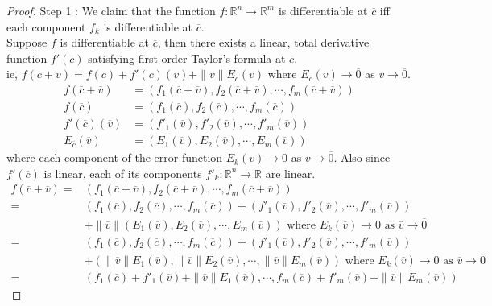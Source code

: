 \begin{proof}
	\par{Step 1 :} We claim that the function $f : \mathbb{R}^n \to \mathbb{R}^m$ is differentiable at $\overline{c}$ iff each component $f_k$ is differentiable at $\overline{c}$.\\

	Suppose $f$ is differentiable at $\overline{c}$, then there exists a linear, total derivative function $f'(\overline{c})$ satisfying first-order Taylor's formula at $\overline{c}$.\\
	ie, $f(\overline{c}+\overline{v}) = f(\overline{c}) + f'(\overline{c})(\overline{v}) + \|\overline{v}\| E_{\overline{c}}(\overline{v})$ where $E_{\overline{c}}(\overline{v}) \to \overline{0}$ as $\overline{v} \to \overline{0}$.
	\begin{align*}
		f(\overline{c}+\overline{v}) & = \left( f_1(\overline{c}+\overline{v}), f_2(\overline{c}+\overline{v}), \cdots, f_m(\overline{c}+\overline{v}) \right)\\
		f(\overline{c}) & = \left( f_1(\overline{c}), f_2(\overline{c}), \cdots, f_m(\overline{c}) \right) \\
		f'(\overline{c})(\overline{v}) & = \left( f'_1(\overline{v}), f'_2(\overline{v}), \cdots, f'_m(\overline{v}) \right) \\
		E_{\overline{c}}(\overline{v}) & = \left( E_1(\overline{v}), E_2(\overline{v}), \cdots, E_m(\overline{v}) \right)
	\end{align*}
	where each component of the error function $E_k(\overline{v}) \to 0$ as $\overline{v} \to \overline{0}$.
	Also since $f'(\overline{c})$ is linear, each of its components $f'_k : \mathbb{R}^n \to \mathbb{R}$ are linear.
	\begin{align*}
		f(\overline{c}+\overline{v}) = & \left( f_1(\overline{c}+\overline{v}), f_2(\overline{c}+\overline{v}), \cdots, f_m(\overline{c}+\overline{v}) \right) \\
		= & \left( f_1(\overline{c}), f_2(\overline{c}), \cdots, f_m(\overline{c}) \right) + \left( f'_1(\overline{v}), f'_2(\overline{v}), \cdots, f'_m(\overline{v}) \right) \\
		& + \|\overline{v}\|\left(E_1(\overline{v}), E_2(\overline{v}), \cdots, E_m(\overline{v}) \right) \text{ where } E_k(\overline{v}) \to 0 \text{ as } \overline{v} \to \overline{0}\\
		= & \left( f_1(\overline{c}), f_2(\overline{c}), \cdots, f_m(\overline{c}) \right) + \left( f'_1(\overline{v}), f'_2(\overline{v}), \cdots, f'_m(\overline{v}) \right) \\
		& + \left(\|\overline{v}\|E_1(\overline{v}), \|\overline{v}\|E_2(\overline{v}), \cdots, \|\overline{v}\|E_m(\overline{v}) \right) \text{ where } E_k(\overline{v}) \to 0 \text{ as } \overline{v} \to \overline{0}\\
		= & \left( f_1(\overline{c}) + f'_1(\overline{v}) + \|\overline{v}\|E_1(\overline{v}), \cdots, f_m(\overline{c}) + f'_m(\overline{v}) + \|\overline{v}\|E_m(\overline{v}) \right) 
	\end{align*}


\end{proof}
